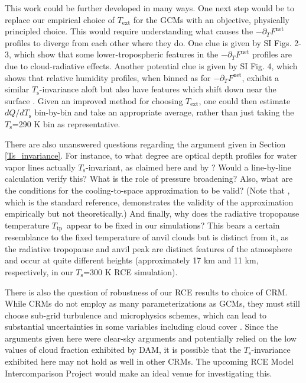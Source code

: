 \documentclass[9pt,twocolumn,twoside,lineno]{pnas-new}
\newcommand{\ppt}{\ensuremath{\partial_T}}
\newcommand{\Fnet}{\ensuremath{F^\mathrm{net}}}
\newcommand{\Ts}{\ensuremath{T_\mathrm{s}}}
\newcommand{\Ttp}{\ensuremath{T_\mathrm{tp}}}
\newcommand{\Text}{\ensuremath{T_\mathrm{ext}}}
\begin{document}
 This work could be further developed in many ways. One next step would be to replace our empirical choice of $\Text$ for the GCMs with an objective, physically principled choice. This would require understanding what causes the $-\ppt\Fnet$ profiles to diverge from each other where they do. One clue is given by SI Figs. 2-3, which show that some lower-tropospheric features in the $-\ppt\Fnet$ profiles are due to cloud-radiative effects. Another potential clue is given by SI Fig. 4, which shows that  relative humidity profiles,  when binned as for $-\ppt \Fnet$, exhibit a similar \Ts-invariance aloft \citep[in line with the CRM results of][]{romps2014} but also have features which shift down near the surface \citep[see also][]{cronin2017}.  Given an improved method for choosing \Text, one could then estimate $dQ/d\Ts$ bin-by-bin and take an appropriate average, rather than just taking the \Ts=290 K bin as representative.
 
 There are also unanswered questions regarding the  argument given in Section \ref{Ts_invariance}. For instance, to what degree are optical depth profiles for water vapor lines actually \Ts-invariant, as claimed here and by \cite{ingram2010}? Would a line-by-line calculation verify this? What is the role of pressure broadening? Also, what are the conditions for the cooling-to-space approximation to be valid? (Note that \cite{rodgers1966}, which is the standard reference, demonstrates the validity of the approximation empirically but not theoretically.) And finally, why does  the radiative tropopause temperature \Ttp\ appear to be fixed in our simulations? This bears a certain resemblance to the fixed temperature of anvil clouds  but is distinct from it, as the radiative tropopause and anvil peak are distinct features of the atmosphere and occur at quite different heights (approximately 17 km and 11 km, respectively, in our \Ts=300 K RCE simulation).

There is also the question of robustness of our RCE results to choice of CRM. While CRMs do not employ as many parameterizations as GCMs, they must still choose sub-grid turbulence and microphysics schemes, which can lead to substantial uncertainties in some variables including cloud cover \cite[e.g.][]{tsushima2015, igel2014}. Since the arguments given here were clear-sky arguments and potentially relied on the low values of  cloud fraction exhibited by DAM, it is possible that the \Ts-invariance exhibited here may not hold as well in other CRMs. The upcoming RCE Model Intercomparison Project \cite[RCEMIP,][]{wing2017b} would make an ideal venue for investigating this.
\end{document}
